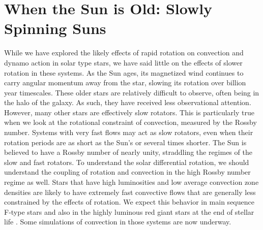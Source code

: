 \section{When the Sun is Old: Slowly Spinning Suns}
While we have explored the likely effects of rapid rotation on
convection and dynamo action in solar type stars, we have said little
on the effects of slower rotation in these systems.  As the Sun ages,
its magnetized wind continues to carry angular momentum away from the
star, slowing its rotation over billion year timescales.  These older
stars are relatively difficult to observe, often being in the halo of
the galaxy.  As such, they have received less observational
attention.  However, many other stars are effectively slow rotators.  
This is particularly true when we look at the rotational constraint of
convection, measured by the Rossby number.  Systems with very fast
flows may act as slow rotators, even when their rotation periods are
as short as the Sun's or several times shorter.  The Sun is
believed to have a Rossby number of nearly unity, straddling the
regimes of the slow and fast rotators.  To understand the solar
differential rotation, we should understand the coupling of rotation
and convection in the high Rossby number regime as well. 
Stars that have high luminosities and low average
convection zone densities are likely to have extremely fast convective
flows that are generally less constrained by the effects of rotation. 
We expect this behavior in main sequence F-type stars \citep{Augustson_et_al_2010}  
and also in the highly luminous red giant stars at the end of stellar
life \citep{Palacios&Brun_2007, Brun&Palacios_2009}.   Some simulations of convection
in those systems are now underway.



